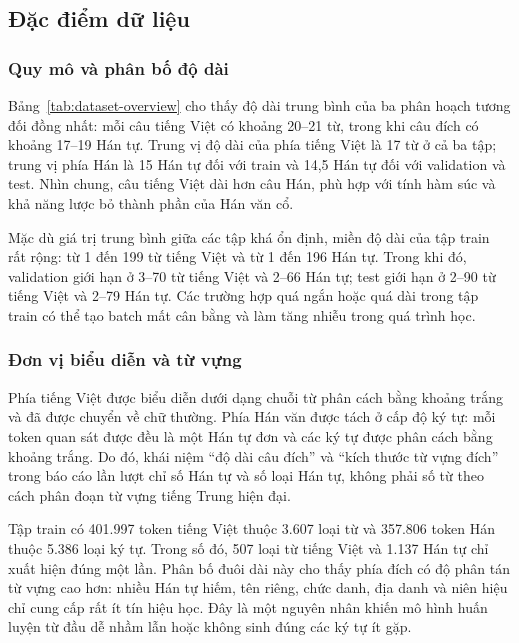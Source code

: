 \subsection{Đặc điểm dữ liệu}

\subsubsection{Quy mô và phân bố độ dài}

Bảng~\ref{tab:dataset-overview} cho thấy độ dài trung bình của ba phân hoạch tương đối đồng nhất: mỗi câu tiếng Việt có khoảng 20--21 từ, trong khi câu đích có khoảng 17--19 Hán tự. Trung vị độ dài của phía tiếng Việt là 17 từ ở cả ba tập; trung vị phía Hán là 15 Hán tự đối với train và 14,5 Hán tự đối với validation và test. Nhìn chung, câu tiếng Việt dài hơn câu Hán, phù hợp với tính hàm súc và khả năng lược bỏ thành phần của Hán văn cổ.

Mặc dù giá trị trung bình giữa các tập khá ổn định, miền độ dài của tập train rất rộng: từ 1 đến 199 từ tiếng Việt và từ 1 đến 196 Hán tự. Trong khi đó, validation giới hạn ở 3--70 từ tiếng Việt và 2--66 Hán tự; test giới hạn ở 2--90 từ tiếng Việt và 2--79 Hán tự. Các trường hợp quá ngắn hoặc quá dài trong tập train có thể tạo batch mất cân bằng và làm tăng nhiễu trong quá trình học.

\subsubsection{Đơn vị biểu diễn và từ vựng}

Phía tiếng Việt được biểu diễn dưới dạng chuỗi từ phân cách bằng khoảng trắng và đã được chuyển về chữ thường. Phía Hán văn được tách ở cấp độ ký tự: mỗi token quan sát được đều là một Hán tự đơn và các ký tự được phân cách bằng khoảng trắng. Do đó, khái niệm ``độ dài câu đích'' và ``kích thước từ vựng đích'' trong báo cáo lần lượt chỉ số Hán tự và số loại Hán tự, không phải số từ theo cách phân đoạn từ vựng tiếng Trung hiện đại.

Tập train có 401.997 token tiếng Việt thuộc 3.607 loại từ và 357.806 token Hán thuộc 5.386 loại ký tự. Trong số đó, 507 loại từ tiếng Việt và 1.137 Hán tự chỉ xuất hiện đúng một lần. Phân bố đuôi dài này cho thấy phía đích có độ phân tán từ vựng cao hơn: nhiều Hán tự hiếm, tên riêng, chức danh, địa danh và niên hiệu chỉ cung cấp rất ít tín hiệu học. Đây là một nguyên nhân khiến mô hình huấn luyện từ đầu dễ nhầm lẫn hoặc không sinh đúng các ký tự ít gặp.

